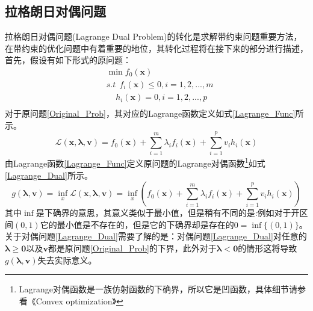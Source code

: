\subsection{拉格朗日对偶问题}
\label{sec:Lagrange_prob}
拉格朗日对偶问题(Lagrange Dual Problem)的转化是求解带约束问题重要方法，在带约束的优化问题中有着重要的地位，其转化过程将在接下来的部分进行描述，首先，假设有如下形式的原问题：
\begin{equation}
\label{Original_Prob}
\begin{split}
&\min f_0(\bm{x})\\
&s.t~~f_i(\bm{x})\leq 0,i=1,2,...,m\\
&~~~~~h_i(\bm{x}) =0,i=1,2,...,p\\
\end{split}
\end{equation}
对于原问题\ref{Original_Prob}，其对应的Lagrange函数定义如式\ref{Lagrange_Func}所示。
\begin{equation}
\label{Lagrange_Func}
\mathcal{L}(\bm{x},\bm{\lambda},\bm{v})=f_0(\bm{x})+\sum_{i=1}^{m}\lambda_i f_i(\bm{x})+\sum_{i=1}^{p}v_ih_i(\bm{x})
\end{equation}
由Lagrange函数\ref{Lagrange_Func}定义原问题的Lagrange对偶函数\footnote{Lagrange对偶函数是一族仿射函数的下确界，所以它是凹函数，具体细节请参看《Convex optimization》}如式\ref{Lagrange_Dual}所示。
\begin{equation}
\label{Lagrange_Dual}
g(\bm{\lambda},\bm{v})=\inf_{x}\mathcal{L}(\bm{x},\bm{\lambda},\bm{v})=\inf_{x}\left(f_0(\bm{x})+\sum_{i=1}^{m}\lambda_i f_i(\bm{x})+\sum_{i=1}^{p}v_ih_i(\bm{x})\right)
\end{equation}
其中$\inf$是下确界的意思，其意义类似于最小值，但是稍有不同的是:例如对于开区间$(0,1)$它的最小值是不存在的，但是它的下确界却是存在的$0=\inf\{(0,1)\}$。关于对偶问题\ref{Lagrange_Dual}需要了解的是：对偶问题\ref{Lagrange_Dual}对任意的$\bm{\lambda} \geq \bm{0}$以及$\bm{v}$都是原问题\ref{Original_Prob}的下界，此外对于$\bm{\lambda} < \bm{0}$的情形这将导致$g(\bm{\lambda},\bm{v})$失去实际意义。

